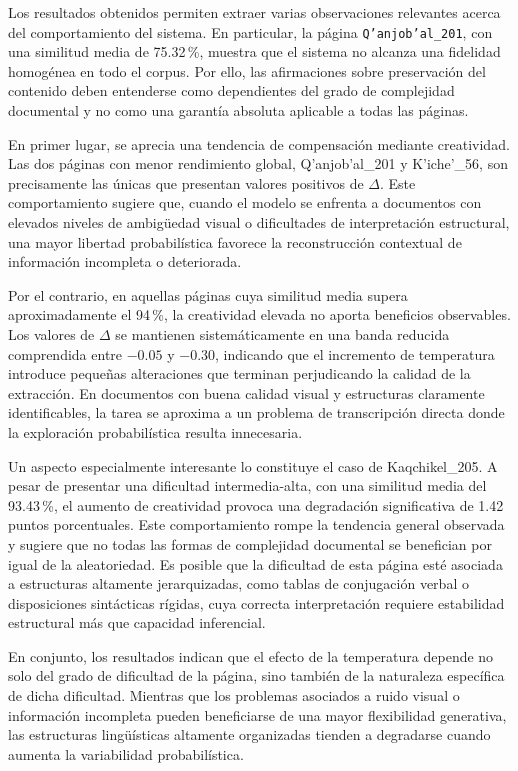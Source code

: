 Los resultados obtenidos permiten extraer varias observaciones relevantes acerca del comportamiento del sistema. En particular, la página \texttt{Q’anjob’al\_201}, con una similitud media de 75.32\,\%, muestra que el sistema no alcanza una fidelidad homogénea en todo el corpus. Por ello, las afirmaciones sobre preservación del contenido deben entenderse como dependientes del grado de complejidad documental y no como una garantía absoluta aplicable a todas las páginas.

En primer lugar, se aprecia una tendencia de compensación mediante creatividad. Las dos páginas con menor rendimiento global, Q'anjob'al\_201 y K'iche'\_56, son precisamente las únicas que presentan valores positivos de \(\Delta\). Este comportamiento sugiere que, cuando el modelo se enfrenta a documentos con elevados niveles de ambigüedad visual o dificultades de interpretación estructural, una mayor libertad probabilística favorece la reconstrucción contextual de información incompleta o deteriorada.

Por el contrario, en aquellas páginas cuya similitud media supera aproximadamente el 94\,\%, la creatividad elevada no aporta beneficios observables. Los valores de \(\Delta\) se mantienen sistemáticamente en una banda reducida comprendida entre \(-0.05\) y \(-0.30\), indicando que el incremento de temperatura introduce pequeñas alteraciones que terminan perjudicando la calidad de la extracción. En documentos con buena calidad visual y estructuras claramente identificables, la tarea se aproxima a un problema de transcripción directa donde la exploración probabilística resulta innecesaria.

Un aspecto especialmente interesante lo constituye el caso de Kaqchikel\_205. A pesar de presentar una dificultad intermedia-alta, con una similitud media del 93.43\,\%, el aumento de creatividad provoca una degradación significativa de 1.42 puntos porcentuales. Este comportamiento rompe la tendencia general observada y sugiere que no todas las formas de complejidad documental se benefician por igual de la aleatoriedad. Es posible que la dificultad de esta página esté asociada a estructuras altamente jerarquizadas, como tablas de conjugación verbal o disposiciones sintácticas rígidas, cuya correcta interpretación requiere estabilidad estructural más que capacidad inferencial.

En conjunto, los resultados indican que el efecto de la temperatura depende no solo del grado de dificultad de la página, sino también de la naturaleza específica de dicha dificultad. Mientras que los problemas asociados a ruido visual o información incompleta pueden beneficiarse de una mayor flexibilidad generativa, las estructuras lingüísticas altamente organizadas tienden a degradarse cuando aumenta la variabilidad probabilística.

